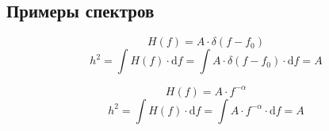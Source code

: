 \subsection{Примеры спектров}
$$H(f) = A \cdot \delta(f - f_0)$$
$$h^2 = \int H(f) \cdot \mathrm{d} f = \int  A \cdot \delta(f - f_0) \cdot \mathrm{d} f = A $$

$$H(f) = A \cdot f^{-\alpha}$$
$$h^2 = \int H(f) \cdot \mathrm{d} f = \int  A \cdot  f^{-\alpha} \cdot \mathrm{d} f = A $$


